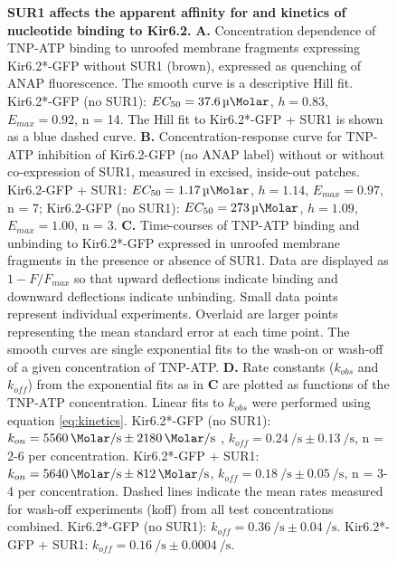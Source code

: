\documentclass[10pt,lineno, doublespacing]{elife_modified}
\begin{document}
\begin{figure}\ContinuedFloat
\begin{fullwidth}
\caption{
\textbf{SUR1 affects the apparent affinity for and kinetics of nucleotide binding to Kir6.2.}
\textbf{A.}
Concentration dependence of TNP-ATP binding to unroofed membrane fragments expressing Kir6.2*-GFP without SUR1 (brown), expressed as quenching of ANAP fluorescence.
The smooth curve is a descriptive Hill fit.
Kir6.2*-GFP (no SUR1): $EC_{50} = \SI{37.6}{\micro\Molar}$, $h = 0.83$, $E_{max} = 0.92$, n = 14.
The Hill fit to Kir6.2*-GFP + SUR1 is shown as a blue dashed curve.
\textbf{B.}
Concentration-response curve for TNP-ATP inhibition of Kir6.2-GFP (no ANAP label) without or without co-expression of SUR1, measured in excised, inside-out patches.
Kir6.2-GFP + SUR1: $EC_{50} = \SI{1.17}{\micro\Molar}$, $h = 1.14$, $E_{max} = 0.97$, n = 7; Kir6.2-GFP (no SUR1): $EC_{50} = \SI{273}{\micro\Molar}$, $h = 1.09$, $E_{max} = 1.00$, n = 3.
\textbf{C.}
Time-courses of TNP-ATP binding and unbinding to Kir6.2*-GFP expressed in unroofed membrane fragments in the presence or absence of SUR1.
Data are displayed as $1 - F/F_{max}$ so that upward deflections indicate binding and downward deflections indicate unbinding.
Small data points represent individual experiments.
Overlaid are larger points representing the mean \pm standard error at each time point.
The smooth curves are single exponential fits to the wash-on or wash-off of a given concentration of TNP-ATP.
\textbf{D.}
Rate constants ($k_{obs}$ and $k_{off}$) from the exponential fits as in \textbf{C} are plotted as functions of the TNP-ATP concentration.
Linear fits to $k_{obs}$ were performed using equation \ref{eq:kinetics}.
Kir6.2*-GFP (no SUR1): $k_{on} = \SI{5560}{\per\Molar\per\second} \pm \SI{2180}{\per\Molar\per\second}$ , $k_{off} = \SI{0.24}{\per\second} \pm \SI{0.13}{\per\second}$, n = 2-6 per concentration.
Kir6.2*-GFP + SUR1: $k_{on} = \SI{5640}{\per\Molar\per\second} \pm \SI{812}{\per\Molar\per\second}$, $k_{off} = \SI{0.18}{\per\second} \pm \SI{0.05}{\per\second}$, n = 3-4 per concentration.
Dashed lines indicate the mean rates measured for wash-off experiments (koff) from all test concentrations combined.
Kir6.2*-GFP (no SUR1): $k_{off} = \SI{0.36}{\per\second} \pm \SI{0.04}{\per\second}$.
Kir6.2*-GFP + SUR1: $k_{off} = \SI{0.16}{\per\second} \pm \SI{0.0004}{\per\second}$.
}
\end{fullwidth}
\end{figure}
\end{document}
